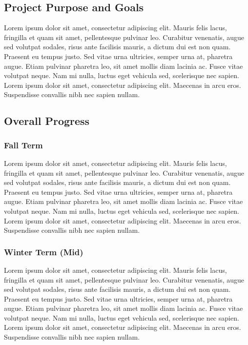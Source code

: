 \documentclass[draftclsnofoot,onecolumn]{IEEEtran}
\begin{document}
\subsection{Project Purpose and Goals}
Lorem ipsum dolor sit amet, consectetur adipiscing elit. Mauris felis lacus, fringilla et quam sit amet, pellentesque pulvinar leo. Curabitur venenatis, augue sed volutpat sodales, risus ante facilisis mauris, a dictum dui est non quam. Praesent eu tempus justo. Sed vitae urna ultricies, semper urna at, pharetra augue. Etiam pulvinar pharetra leo, sit amet mollis diam lacinia ac. Fusce vitae volutpat neque. Nam mi nulla, luctus eget vehicula sed, scelerisque nec sapien. Lorem ipsum dolor sit amet, consectetur adipiscing elit. Maecenas in arcu eros. Suspendisse convallis nibh nec sapien nullam.





\subsection{Overall Progress}

\subsubsection{Fall Term}
Lorem ipsum dolor sit amet, consectetur adipiscing elit. Mauris felis lacus, fringilla et quam sit amet, pellentesque pulvinar leo. Curabitur venenatis, augue sed volutpat sodales, risus ante facilisis mauris, a dictum dui est non quam. Praesent eu tempus justo. Sed vitae urna ultricies, semper urna at, pharetra augue. Etiam pulvinar pharetra leo, sit amet mollis diam lacinia ac. Fusce vitae volutpat neque. Nam mi nulla, luctus eget vehicula sed, scelerisque nec sapien. Lorem ipsum dolor sit amet, consectetur adipiscing elit. Maecenas in arcu eros. Suspendisse convallis nibh nec sapien nullam.

\subsubsection{Winter Term (Mid)}
Lorem ipsum dolor sit amet, consectetur adipiscing elit. Mauris felis lacus, fringilla et quam sit amet, pellentesque pulvinar leo. Curabitur venenatis, augue sed volutpat sodales, risus ante facilisis mauris, a dictum dui est non quam. Praesent eu tempus justo. Sed vitae urna ultricies, semper urna at, pharetra augue. Etiam pulvinar pharetra leo, sit amet mollis diam lacinia ac. Fusce vitae volutpat neque. Nam mi nulla, luctus eget vehicula sed, scelerisque nec sapien. Lorem ipsum dolor sit amet, consectetur adipiscing elit. Maecenas in arcu eros. Suspendisse convallis nibh nec sapien nullam.
\end{document}
